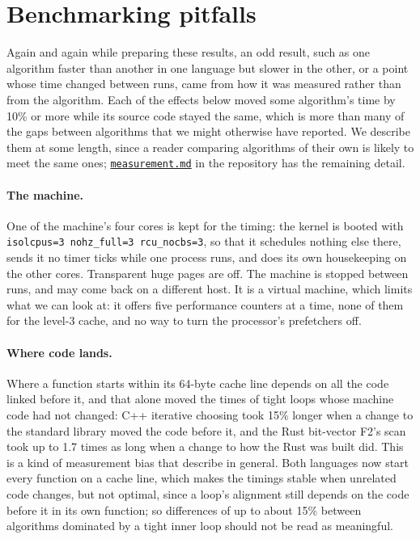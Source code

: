 \documentclass[letterpaper,11pt]{article}
\newcommand{\repo}[2]{\href{https://github.com/ciphergoth/sansreplace/blob/paper_v1/#1}{#2}}
\begin{document}
\clearpage
\printbibliography

\appendix
\section{Benchmarking pitfalls}\label{pitfalls}

Again and again while preparing these results, an odd result, such as
one algorithm faster than another in one language but slower in the
other, or a point whose time changed between runs, came from how it was
measured rather than from the algorithm. Each of the effects below
moved some algorithm's time by 10\% or more while its source code stayed
the same, which is more than many of the gaps between algorithms that
we might otherwise have reported. We describe them at some length,
since a reader comparing algorithms of their own is likely to meet the
same ones;
\repo{measurement.md}{\texttt{measurement.md}}
in the repository has the remaining detail.

\paragraph{The machine.} One of the machine's four cores is kept for
the timing: the kernel is booted with
\verb|isolcpus=3 nohz_full=3 rcu_nocbs=3|, so that it schedules nothing
else there, sends it no timer ticks while one process runs, and does
its own housekeeping on the other cores. Transparent huge pages are
off. The machine is stopped between runs, and may come back on a
different host. It is a virtual machine, which limits what we can look
at: it offers five performance counters at a time, none of them for the
level-3 cache, and no way to turn the processor's prefetchers off.

\paragraph{Where code lands.} Where a function starts within its
64-byte cache line depends on all the code linked before it, and that
alone moved the times of tight loops whose machine code had not
changed: C++ iterative choosing took 15\% longer when a change to the
standard library moved the code before it, and the Rust bit-vector F2's
scan took up to 1.7 times as long when a change to how the Rust was
built did. This is a kind of measurement bias that \textcite{mytkowicz}
describe in general. Both languages now start every function on a cache
line, which makes the timings stable when unrelated code changes, but
not optimal, since a loop's alignment still depends on the code before
it in its own function; so differences of up to about 15\% between
algorithms dominated by a tight inner loop should not be read as
meaningful.
\end{document}
